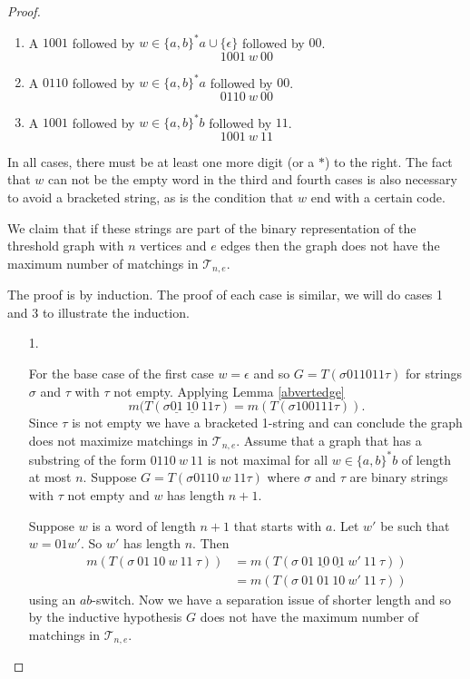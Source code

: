 \documentclass[12pt]{amsart}
\theoremstyle{plain}
\theoremstyle{definition}
\newcommand{\cT}{\mathcal{T}}
\begin{document}
\begin{proof}
\begin{enumerate}
\item A $1001$ followed by $w\in\{a,b\}^*a\cup\{\epsilon\}$ followed by $00$.
$$1001~w~ 00$$

\item  A $0110$ followed by $w\in\{a,b\}^*a$ followed by $00$.
$$0110~w~00$$

\item  A $1001$ followed by $w\in\{a,b\}^*b$ followed by $11$.  
$$1001~w~11$$
\end{enumerate}

In all cases, there must be at least one more digit (or a $*$) to the right. The fact that $w$ can not be the empty word in the third and fourth cases is also necessary to avoid a bracketed string, as is the condition that $w$ end with a certain code.   

We claim that if these strings are part of the binary representation of the threshold graph with $n$ vertices and $e$ edges then the graph does not have the maximum number of matchings in $\cT_{n,e}$.

  The proof is by induction.  The proof of each case is similar, we will do cases 1 and 3 to illustrate the induction.
  
 \begin{enumerate}
 \item[1.]  %
 
For the base case of the first case $w = \epsilon$ and so $G = T(\sigma 011011\tau)$ for strings $\sigma$ and $\tau$ with $\tau$ not empty.  Applying Lemma \ref{abvertedge}
 $$m(T(\sigma \underline{01}~\underline{10}~11 \tau) = m(T(\sigma 100111 \tau)).$$
Since $\tau$ is not empty we have a bracketed 1-string and can conclude the graph does not maximize matchings in $\cT_{n,e}$.  
Assume that a graph that has a substring of the form $0110~w~11$ is not maximal for all $w\in\{a,b\}^*b$ of length at most $n$.  Suppose $G = T(\sigma 0110 ~w~11\tau)$ where $\sigma$ and $\tau$ are binary strings with $\tau$ not empty and $w$ has length $n+1$.
 
   Suppose $w$ is a word of length $n+1$ that starts with $a$.  Let $w'$ be such that $w = 01 w'$.  So $w'$ has length $n$.  Then
 \begin{align*}
 m(T(\sigma~ 01~10~w~11~\tau))&=m(T(\sigma~ 01~\underline{10}~\underline{01}~w'~11~\tau))\\
 &= m(T(\sigma~ 01~ 01~10~w'~11~ \tau))
 \end{align*}
 using an $ab$-switch.  Now we have a separation issue of shorter length and so by the inductive hypothesis $G$ does not have the maximum number of matchings in $\cT_{n,e}$.
  

\end{enumerate}
\end{proof}
\end{document}
